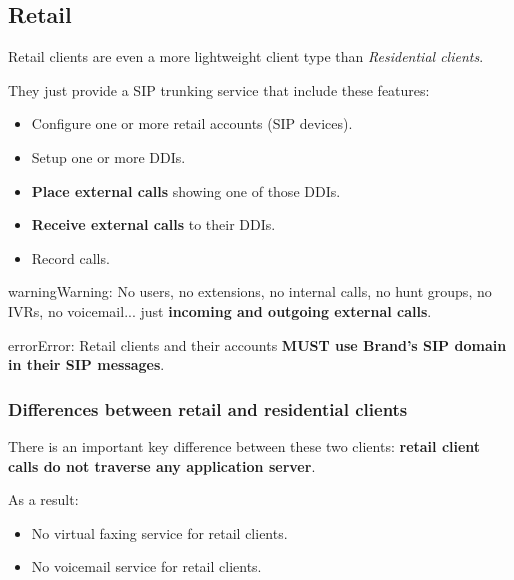 \documentclass[letterpaper,10pt,english]{sphinxmanual}
\begin{document}
\subsection{Retail}
\label{administration_portal/brand/clients/retail:retail-clients}\label{administration_portal/brand/clients/retail:retail}\label{administration_portal/brand/clients/retail::doc}
Retail clients are even a more lightweight client type than \emph{Residential clients}.

They just provide a SIP trunking service that include these features:
\begin{itemize}
\item {} 
Configure one or more retail accounts (SIP devices).

\item {} 
Setup one or more DDIs.

\item {} 
\textbf{Place external calls} showing one of those DDIs.

\item {} 
\textbf{Receive external calls} to their DDIs.

\item {} 
Record calls.

\end{itemize}

\begin{notice}{warning}{Warning:}
No users, no extensions, no internal calls, no hunt groups, no IVRs, no voicemail...
just \textbf{incoming and outgoing external calls}.
\end{notice}

\begin{notice}{error}{Error:}
Retail clients and their accounts \textbf{MUST use Brand's SIP domain in their SIP messages}.
\end{notice}


\subsubsection{Differences between retail and residential clients}
\label{administration_portal/brand/clients/retail:differences-between-retail-and-residential-clients}
There is an important key difference between these two clients: \textbf{retail client calls do not traverse
any application server}.

As a result:
\begin{itemize}
\item {} 
No virtual faxing service for retail clients.

\item {} 
No voicemail service for retail clients.

\end{itemize}
\end{document}
